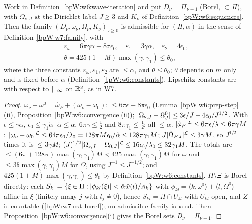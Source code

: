 \begin{lemma}\label{bpW:w6:freq-lip}
Work in Definition~\ref{bpW:w6:wave-iteration} and put $D_\nu=\Pi_{\nu-1}$ (Borel, $\subset\Pi$), with $\Omega_{\nu,J}$ at the
Dirichlet label $J\ge3$ and $K_\nu$ of Definition~\ref{bpW:w6:sequences}. Then the family
$(D_\nu,\omega_\nu,\Omega_\nu,K_\nu)_{\nu\ge0}$ is admissible for $(\Pi,\alpha)$ in the sense of
Definition~\ref{bpW:w7:family}, with
\begin{gather*}\varepsilon_\omega=6\pi\gamma\alpha+8\pi\epsilon_0,\quad\varepsilon_1=3\gamma\alpha,\quad\varepsilon_2=4\epsilon_0,\\
\theta=425(1+M)\max(\gamma,\gamma_1)\le\theta_0,\end{gather*}
where the three constants $\varepsilon_\omega,\varepsilon_1,\varepsilon_2$ are $\le\alpha$, and $\theta\le\theta_0$; $\theta$ depends on
$m$ only and is fixed before $\alpha$ (Definition~\ref{bpW:w6:constants}). Lipschitz constants are with respect to $\lvert \cdot\rvert_\infty$ on
$\mathbb{R}^2$, as in W7.
\end{lemma}
\begin{proof}
\label{stepW:w6:fl-size} $\omega_\nu-\omega^0=\hat\omega_P+(\omega_\nu-\omega_0)$: $\le6\pi\epsilon+8\pi\epsilon_0$ (Lemma~\ref{bpW:w6:prep-step}(ii),
Proposition~\ref{bpW:w6:convergence}(ii)); $\lvert \Omega_{\nu,J}-\Omega^0_J\rvert\le3\epsilon/J+4\epsilon_0/J^{1/2}$. With $\epsilon\le\gamma\alpha$,
$\epsilon_0\le\gamma_1\check\alpha$, $\check\alpha\le\alpha$, $6\pi\gamma\le\frac12$ and $8\pi\gamma_1\le\frac12$: all $\le\alpha$.
\label{stepW:w6:fl-lip} $\lvert \hat\omega_P\rvert^{\mathcal L}\le6\pi\epsilon/\lambda\le6\pi\gamma M$; $\lvert \omega_\nu-\omega_0\rvert^{\mathcal L}\le64\pi\epsilon_0/\lambda_0=128\pi M\epsilon_0/\check\alpha\le128\pi\gamma_1M$;
$J\lvert \hat\Omega_{P,J}\rvert^{\mathcal L}\le3\gamma M$, so $J^{1/2}$ times it is $\le3\gamma M$; $(J)^{1/2}\lvert \Omega_{\nu,J}-\Omega_{0,J}\rvert^{\mathcal L}\le16\epsilon_0/\lambda_0\le32\gamma_1M$.
The totals are $\le(6\pi+128\pi)\max(\gamma,\gamma_1)M<425\max(\gamma,\gamma_1)M$ for $\omega$ and $\le35\max(\gamma,\gamma_1)M$ for $\Omega$,
using $J^{-1}\le J^{-1/2}$; and $425(1+M)\max(\gamma,\gamma_1)\le\theta_0$ by Definition~\ref{bpW:w6:constants}.
\label{stepW:w6:fl-borel} $\Pi\setminus\Xi$ is Borel directly: each $S_{kl}=\{\xi\in\Pi:\lvert \phi_{kl}(\xi)\rvert<\hat\alpha\hat w(l)/A_k\}$
with $\phi_{kl}=\langle k,\omega^0\rangle+\langle l,\Omega^0\rangle$ affine in $\xi$ (finitely many $j$ with $l_j\ne0$), hence $S_{kl}=\Pi\cap U_{kl}$
with $U_{kl}$ open, and $Z$ is countable (\ref{bpW:w7:ext-borel}); no admissible family is used. Then
Proposition~\ref{bpW:w6:convergence}(i) gives the Borel sets $D_\nu=\Pi_{\nu-1}$.
\end{proof}

